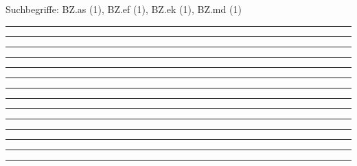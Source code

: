 \documentclass[a4paper,12pt]{report}
\begin{document}

 \scriptsize Suchbegriffe: BZ.as (1), BZ.ef (1), BZ.ek (1), BZ.md (1)\normalsize 
 
%
\hrule	 \leer

%
\hrule	 \leer

%
\hrule	 \leer

%
\hrule	 \leer

%
\hrule	 \leer

%
\hrule	 \leer

%
\hrule	 \leer

%
\hrule	 \leer

%
\hrule	 \leer

%
\hrule	 \leer

%
\hrule	 \leer

%
\hrule	 \leer

%
\hrule	 \leer

%
\hrule	 \leer

\end{document}

